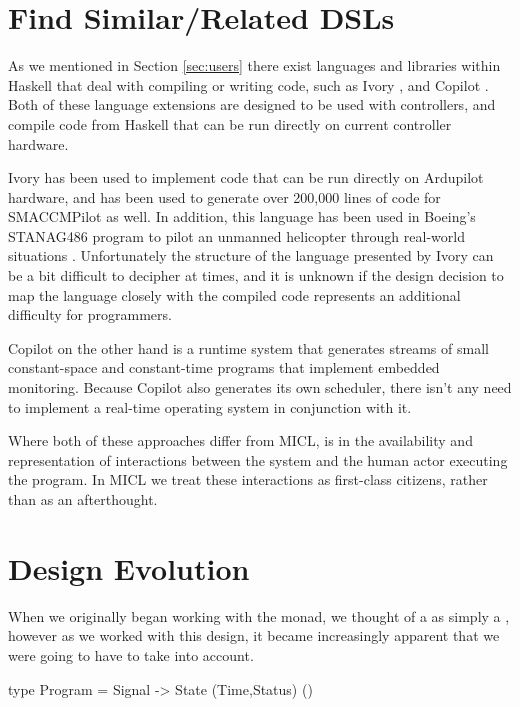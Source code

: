 \documentclass[11pt]{article}
\begin{document}
\section{Find Similar/Related DSLs}
\label{sec:related}
As we mentioned in Section \ref{sec:users} there exist languages and libraries
within Haskell that deal with compiling or writing  code, such as
Ivory \cite{elliot2015ivory}, and Copilot \cite{pike2010copilot}. Both of
these language extensions are designed to be used with controllers, and
compile  code from Haskell that can be run directly on current
controller hardware.

Ivory has been used to implement code that can be run directly on Ardupilot
hardware, and has been used to generate over 200,000 lines of code for
SMACCMPilot as well. In addition, this language has been used in Boeing's
STANAG486 program to pilot an unmanned helicopter through real-world
situations \cite{boeing2016auto}. Unfortunately the structure of the language
presented by Ivory can be a bit difficult to decipher at times, and it is
unknown if the design decision to map the language closely with the compiled
code represents an additional difficulty for programmers.

Copilot on the other hand is a runtime system that generates streams of small
constant-space and constant-time  programs that implement embedded
monitoring. Because Copilot also generates its own scheduler, there isn't any
need to implement a real-time operating system in conjunction with it.

Where both of these approaches differ from MICL, is in the availability and
representation of interactions between the system and the human actor
executing the program. In MICL we treat these interactions as first-class
citizens, rather than as an afterthought.


\section{Design Evolution}
\label{sec:evol}
When we originally began working with the  monad, we thought of a
 as simply a , however as we
worked with this design, it became increasingly apparent that we were going to
have to take  into account.

\begin{program}
type Program = Signal -> State (Time,Status) ()
\end{program}
\end{document}
